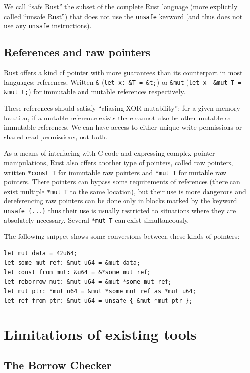 \documentclass[a4paper,11pt]{article}
\theoremstyle{plain}
\theoremstyle{definition}
\theoremstyle{remark}
\newcommand{\tcode}[1]{\texttt{#1}}
\begin{document}
We call ``safe Rust'' the subset of the complete Rust language (more explicitly called ``unsafe Rust'')
that does not use the \tcode{unsafe} keyword (and thus does not use any \texttt{unsafe}
instructions).

\subsection{References and raw pointers}

Rust offers a kind of pointer with more guarantees than its counterpart in most
languages: references. Written \tcode{\&} (\texttt{let x:~\&T = \&t;}) or
\tcode{\&mut} (\texttt{let x:~\&mut T = \&mut t;}) for immutable and mutable
references respectively.

These references should satisfy ``aliasing XOR mutability'': for a given memory
location, if a mutable reference exists there cannot also be other mutable or
immutable references. We can have access to either unique write permissions or
shared read permissions, not both.


As a means of interfacing with C code and expressing complex pointer manipulations,
Rust also offers another type of pointers, called raw pointers, written
\tcode{*const T} for immutable raw pointers and \tcode{*mut T} for mutable
raw pointers. There pointers can bypass some requirements of references (there
can exist multiple \texttt{*mut T} to the same location), but their use is more
dangerous and dereferencing raw pointers can be done only in blocks marked by
the keyword \tcode{unsafe \{...\}} thus their use is usually restricted to
situations where they are absolutely necessary.
Several \tcode{*mut T} can exist simultaneously.


The following snippet shows some conversions between these kinds of pointers:
\begin{lstlisting}
let mut data = 42u64;
let some_mut_ref: &mut u64 = &mut data;
let const_from_mut: &u64 = &*some_mut_ref;
let reborrow_mut: &mut u64 = &mut *some_mut_ref;
let mut_ptr: *mut u64 = &mut *some_mut_ref as *mut u64;
let ref_from_ptr: &mut u64 = unsafe { &mut *mut_ptr };
\end{lstlisting}

\section{Limitations of existing tools}

\subsection{The Borrow Checker}
\end{document}
